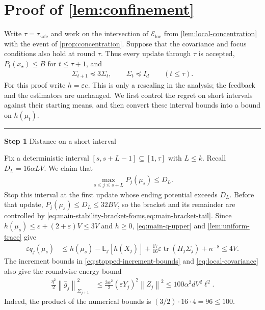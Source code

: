 \documentclass[11pt]{article}
\newcommand{\proofstep}[2]{%
    \par\medskip
    \noindent
    \textcolor{blue!55!black}{\rule{2pt}{1.2em}}%
    \hspace{0.6em}%
    {\sffamily\bfseries\color{blue!55!black}Step #1}%
    \quad
    {\sffamily #2}%
    \par\smallskip
}
\newcommand{\E}{\mathbb E}
\newcommand{\tr}{\operatorname{tr}}
\newcommand{\1}{\mathbf 1}
\newcommand{\eps}{\varepsilon}
\newcommand{\norm}[1]{\left\lVert #1\right\rVert}
\newcommand{\normm}[2]{\left\lVert #1\right\rVert_{#2}}
\begin{document}
\section{Proof of \cref{lem:confinement}}
\label{app:confinement}

Write $\tau=\tau_{\mathrm{safe}}$ and work on the intersection of
$\mathcal E_{\mathrm{loc}}$ from \cref{lem:local-concentration} with the
event of \cref{prop:concentration}. Suppose that the covariance and focus
conditions also hold at round $\tau$. Thus every update through $\tau$ is
accepted, $P_t(x_\star)\leq B$ for $t\leq\tau+1$, and
\begin{align}
    \Sigma_{t+1}\preceq3\Sigma_t,
    \qquad\Sigma_t\preceq I_d
    \qquad(t\leq\tau).
    \label{eq:local-covariance}
\end{align}
For this proof write $h=\eps e$. This is only a rescaling in the analysis;
the feedback and the estimators are unchanged. We first control the
regret on short intervals against their starting means, and then convert
these interval bounds into a bound on $h(\mu_t)$.

\proofstep{1}{Distance on a short interval}
Fix a deterministic interval $[s,s+L-1]\subseteq[1,\tau]$ with $L\leq k$.
Recall $D_L=16\alpha LV$. We claim that
\begin{align}
    \max_{s\leq j\leq s+L}P_j(\mu_s)\leq D_L.
    \label{eq:local-distance}
\end{align}
Stop this interval at the first update whose ending potential exceeds
$D_L$. Before that update, $P_j(\mu_s)\leq D_L\leq32BV$, so the bracket
and its remainder are controlled by
\cref{eq:main-stability-bracket-focus,eq:main-bracket-tail}.
Since $h(\mu_s)\leq\eps+(2+\eps)V\leq3V$ and $h\geq0$,
\eqref{eq:main-q-upper} and \cref{lem:uniform-trace} give
\begin{align}
    \eps q_j(\mu_s)
     & \leq h(\mu_s)-\E_j[h(X_j)]
    +\frac{17}{16}\eps\tr(H_j\Sigma_j)+n^{-8}
    \leq4V.
    \label{eq:local-q-upper}
\end{align}
The increment bounds in \eqref{eq:stopped-increment-bounds} and
\eqref{eq:local-covariance} also give the roundwise energy bound
\begin{align}
    \frac{\eta^2}{2}\normm{\widehat g_j}{\Sigma_{j+1}}^2
     & \leq\frac{3\alpha^2}{2}(\eps Y_j)^2\norm{Z_j}^2
    \leq100\alpha^2dV^2\ell^2.
    \label{eq:local-energy}
\end{align}
Indeed, the product of the numerical bounds is
$(3/2)\cdot16\cdot4=96\leq100$.
\end{document}
